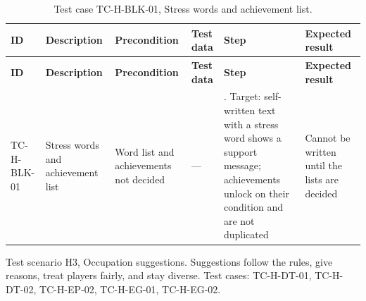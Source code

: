 {\footnotesize{}\renewcommand{\arraystretch}{1.1}
\begin{longtable}{|>{\raggedright\arraybackslash}p{}|>{\raggedright\arraybackslash}p{}|>{\raggedright\arraybackslash}p{}|>{\raggedright\arraybackslash}p{}|>{\raggedright\arraybackslash}p{}|>{\raggedright\arraybackslash}p{}|}
\caption{Test case TC-\allowbreak{}H-\allowbreak{}BLK-\allowbreak{}01, Stress words and achievement list.} \\
\hline
\textbf{ID} & \textbf{Description} & \textbf{Precondition} & \textbf{Test data} & \textbf{Step} & \textbf{Expected result} \\ \hline
\endfirsthead
\hline
\textbf{ID} & \textbf{Description} & \textbf{Precondition} & \textbf{Test data} & \textbf{Step} & \textbf{Expected result} \\ \hline
\endhead
TC-H-BLK-01 & Stress words and achievement list & Word list and achievements not decided & --- & 1. Target: self-\allowbreak{}written text with a stress word shows a support message; achievements unlock on their condition and are not duplicated & Cannot be written until the lists are decided \\ \hline
\end{longtable}
}

Test scenario H3, Occupation suggestions. Suggestions follow the rules, give reasons, treat players fairly, and stay diverse. Test cases: TC-H-DT-01, TC-H-DT-02, TC-H-EP-02, TC-H-EG-01, TC-H-EG-02.

